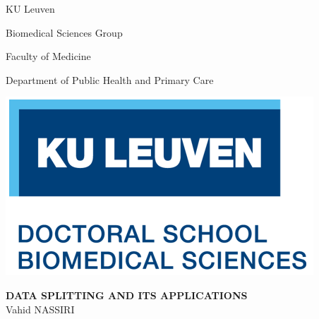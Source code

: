 \begin{titlepage}
{\selectfont
\vspace*{-2.9cm}
{
\centerline{KU Leuven \hfill }
\centerline{Biomedical Sciences Group \hfill }
\centerline{Faculty of Medicine \hfill } 
\centerline{Department of Public Health and Primary Care \hfill } }
\vspace*{-2.4cm}
\hspace{2cm}
\centerline{\phantom{tram 9}\hfill \includegraphics{./logodoctschool.png} }


\begin{minipage}{1.2\textwidth}													%
\begin{flushleft} %
\vspace{2cm}
\hspace{1cm}\textbf{\Large{DATA SPLITTING AND ITS APPLICATIONS}} \\

\vspace{0.7cm}
\hspace{1cm}\large{Vahid NASSIRI}
\end{flushleft}																	
\end{minipage}	

}
\end{titlepage}
